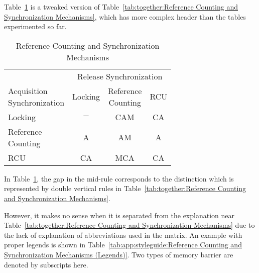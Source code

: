 Table~\ref{tab:app:styleguide:Reference Counting and Synchronization Mechanisms}
is a tweaked version of
Table~\ref{tab:together:Reference Counting and Synchronization Mechanisms},
which has more complex header than the tables experimented so far.

\begin{table}[tb]
\small
\centering
\renewcommand*{\arraystretch}{1.25}
\begin{tabular}{lccc}
	\toprule
	& \multicolumn{3}{c}{Release Synchronization} \\
	\cmidrule(l){2-4}
	\parbox[c]{.8in}{Acquisition\\Synchronization}
			& Locking
				& \parbox[c]{.5in}{Reference\\Counting}
				        & RCU \\
	 \cmidrule(l){2-4}
	Locking		& $-$	& CAM	& CA  \\
	\parbox[c][6ex]{.8in}{Reference\\Counting}
			& A	& AM	& A   \\
	RCU		& CA	& MCA	& CA  \\
	\bottomrule
\end{tabular}
\caption{Reference Counting and Synchronization Mechanisms}
\label{tab:app:styleguide:Reference Counting and Synchronization Mechanisms}
\end{table}

In
Table~\ref{tab:app:styleguide:Reference Counting and Synchronization Mechanisms},
the gap in the mid-rule corresponds to the distinction
which is represented by double vertical rules in
Table~\ref{tab:together:Reference Counting and Synchronization Mechanisms}.

However, it makes no sense when it is separated from the explanation near~%
Table~\ref{tab:together:Reference Counting and Synchronization Mechanisms}
due to the lack of explanation of abbreviations used in the matrix.
An example with proper legends is shown in
Table~\ref{tab:app:styleguide:Reference Counting and Synchronization Mechanisms (Legends)}.
Two types of memory barrier are denoted by subscripts here.

